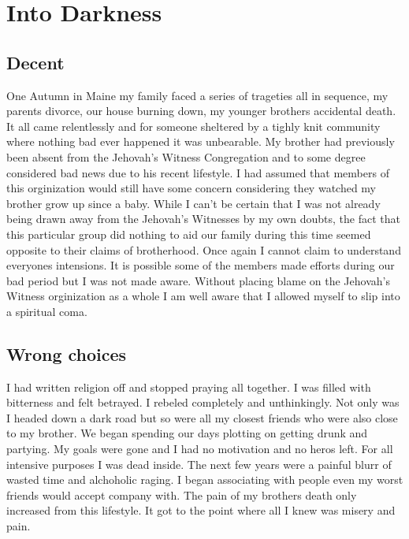 \documentclass[11pt,a4paper]{scrartcl} %
\begin{document}
\section{Into Darkness}
\begin{doublespace}
\subsection{Decent}
One Autumn in Maine my family faced a series of trageties all in sequence, my parents divorce, our house burning down, my younger brothers accidental death. It all came relentlessly and for someone sheltered by a tighly knit community where nothing bad ever happened it was unbearable. My brother had previously been absent from the Jehovah's Witness Congregation and to some degree considered bad news due to his recent lifestyle. I had assumed that members of this orginization would still have some concern considering they watched my brother grow up since a baby. While I can't be certain that I was not already being drawn away from the Jehovah's Witnesses by my own doubts, the fact that this particular group did nothing to aid our family during this time seemed opposite to their claims of brotherhood. Once again I cannot claim to understand everyones intensions. It is possible some of the members made efforts during our bad period but I was not made aware. Without placing blame on the Jehovah's Witness orginization as a whole I am well aware that I allowed myself to slip into a spiritual coma. 
\subsection{Wrong choices}
I had written religion off and stopped praying all together. I was filled with bitterness and felt betrayed. I rebeled completely and unthinkingly. Not only was I headed down a dark road but so were all my closest friends who were also close to my brother. We began spending our days plotting on getting drunk and partying. My goals were gone and I had no motivation and no heros left. For all intensive purposes I was dead inside. The next few years were a painful blurr of wasted time and alchoholic raging. I began associating with people even my worst friends would accept company with. The pain of my brothers death only increased from this lifestyle. It got to the point where all I knew was misery and pain. 
\end{doublespace}
\begin{center}
\textcolor{Maroon}{}\\
\textcolor{brown}{}\\
\end{center}
\end{document}
